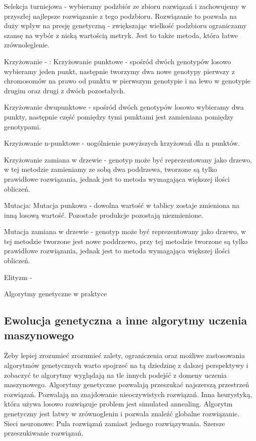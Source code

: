 Selekcja turniejowa - wybieramy podzbiór ze zbioru rozwiązań i zachowujemy w przyszłej najlepsze rozwiązanie z tego podzbioru.
Rozwiązanie to pozwala na duży wpływ na presję genetyczną - zwiększając wielkość podzbioru ograniczamy szansę na wybór z niską wartością metryk.  Jest to także metoda, która łatwe zrównoleglenie.

Krzyżowanie - :
Krzyżowanie punktowe - spośród dwóch genotypów losowo wybieramy jeden punkt, następnie tworzymy dwa nowe genotypy pierwszy z chromosomów na prawo od punktu w pierwszym genotypie i na lewo w genotypie drugim oraz drugi z dwóch pozostałych.

Krzyżowanie dwupunktowe - spośród dwóch genotypów losowo wybieramy dwa punkty, następnie część pomiędzy tymi punktami jest zamieniana pomiędzy genotypami.

Krzyżowanie n-punktowe - uogólnienie powyższych krzyżowań dla n punktów.

Krzyżowanie zamiana w drzewie - genotyp może być reprezentowany jako drzewo, w tej metodzie zamieniamy ze sobą dwa poddrzewa, tworzone są tylko prawidłowe rozwiązania, jednak jest to metoda wymagająca większej ilości obliczeń.  

Mutacja:
Mutacja punkowa - dowolna wartość w tablicy zostaje zmieniona na inną losową wartość. Pozostałe produkcje pozostają niezmienione.

Mutacja zamiana w drzewie - genotyp może być reprezentowany jako drzewo, w tej metodzie tworzone jest nowe poddrzewo, przy tej metodzie tworzone są tylko prawidłowe rozwiązania, jednak jest to metoda wymagająca większej ilości obliczeń. 

Elityzm -

Algorytmy genetyczne w praktyce

 
  
\subsection{Ewolucja genetyczna a inne algorytmy uczenia maszynowego}
Żeby lepiej zrozumieć zrozumieć zalety, ograniczenia oraz możliwe zastosowania algorytmów genetycznych warto spojrzeć na tą dziedzinę z dalszej perspektywy i zobaczyć te algorytmy wyglądają na tle innych podejść z domeny uczenia maszynowego.
Algorytmy genetyczne pozwalają przeszukać najszerszą przestrzeń rozwiązań. Pozwalają na znajdowanie nieoczywistych rozwiązań.  
Inna heurystyką, która używa losowo rozwiązuje problem jest simulated annealing. Algorytm genetyczny jest łatwy w zrównogleniu i pozwala znaleźć globalne rozwiązanie.
Sieci neuronowe:
Pula rozwiązań zamiast jednego rozwiązywania. Szersze przeszukiwanie rozwiązań. 

